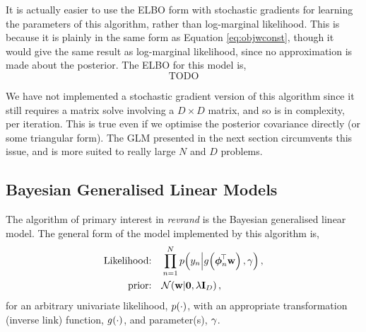 \documentclass[11pt, oneside]{article}
\begin{document}
It is actually easier to use the ELBO form with stochastic gradients for
learning the parameters of this algorithm, rather than log-marginal likelihood.
This is because it is plainly in the same form as Equation
\eqref{eq:objwconst}, though it would give the same result as log-marginal
likelihood, since no approximation is made about the posterior. The ELBO for
this model is,
\begin{equation}
    \text{TODO}
\end{equation}

We have not implemented a stochastic gradient version of this algorithm since
it still requires a matrix solve involving a $D \times D$ matrix, and so is
 in complexity, per iteration. This is true even if we optimise the
posterior covariance directly (or some triangular form). The GLM presented in
the next section circumvents this issue, and is more suited to really large $N$
and $D$ problems.


\subsection{Bayesian Generalised Linear Models}

The algorithm of primary interest in \emph{revrand} is the Bayesian generalised
linear model. The general form of the model implemented by this algorithm is,
\begin{align}
    \text{Likelihood:} \quad &\prod^N_{n=1} 
        p\!\left({y_n}\middle\vert{\ensuremath{{g}_{}\!\left({{\boldsymbol\phi_n^{\!\top}\mathbf{w}}}\right)}, \ensuremath{\gamma}}\right), 
        \label{eq:glmlike} \\
    \text{prior:} \quad &\mathcal{N}\!\left({\mathbf{w}}\middle\vert{\mathbf{0}, \ensuremath{\lambda}\ensuremath{\mathbf{I}_{D}}}\right),
\end{align}
for an arbitrary univariate likelihood, $p\!\left({\cdot}\right)$, with an appropriate
transformation (inverse link) function, ${g}_{}\!\left({{\cdot}}\right)$, and parameter(s),
$\gamma$. 
\end{document}
